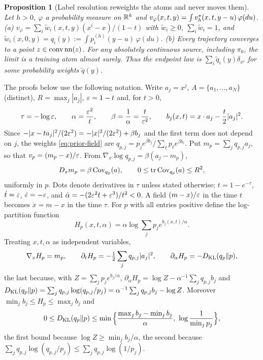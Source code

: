 \documentclass{article}
\theoremstyle{plain}
\newtheorem{proposition}{Proposition}
\theoremstyle{remark}
\begin{document}
\begin{proposition}[Label resolution reweights the atoms and never moves them]
\label{prop:filtered}
Let $h>0$, $\varphi$ a probability measure on $\mathbb{R}^k$ and
$v_\varphi(x,t,y)=\int v_h^\star(x,t,y-u)\,\varphi(du)$. (a) $v_\varphi=\sum_i\tilde
w_i(x,t,y)(x^i-x)/(1-t)$ with $\tilde w_i\ge0$, $\sum_i\tilde w_i=1$, and $\tilde
w_i(x,0,y)=q_i(y):=\int p_i^{(h)}(y-u)\,\varphi(du)$. (b) Every trajectory converges to a
point $z\in\operatorname{conv}\operatorname{nn}(z)$. For any absolutely continuous source, including
$\pi_0$, the limit is a training atom almost surely. Thus the endpoint law is
$\sum_i\tilde q_i(y)\delta_{x^i}$ for some probability weights $\tilde q(y)$.
\end{proposition}


The proofs below use the following notation. Write $a_j=x^j$, $A=\{a_1,\dots,a_N\}$ (distinct),
$R=\max_j|a_j|$, $\varepsilon=1-t$ and, for $t>0$,
\[
\tau=-\log\varepsilon,\qquad \alpha=\frac{\varepsilon^2}{t},\qquad \beta=\frac1\alpha=\frac{t}{\varepsilon^2},
\qquad b_j(x,t)=x\cdot a_j-\frac t2|a_j|^2 .
\]
Since $-|x-ta_j|^2/(2\varepsilon^2)=-|x|^2/(2\varepsilon^2)+\beta b_j$ and the first term does not depend on
$j$, the weights \eqref{eq:prior-field} are
$q_{p,j}=p_je^{\beta b_j}/\sum_\ell p_\ell e^{\beta b_\ell}$. Put $m_p=\sum_jq_{p,j}a_j$, so that
$v_p=(m_p-x)/\varepsilon$. From $\nabla_x\log q_{p,j}=\beta(a_j-m_p)$,
\begin{equation}
D_xm_p=\beta\operatorname{Cov}_{q_p}(a),\qquad 0\le\operatorname{tr}\operatorname{Cov}_{q_p}(a)\le R^2,
\label{eq:pf:int:dm}
\end{equation}
uniformly in $p$. Dots denote derivatives in $\tau$ unless stated otherwise; $t=1-e^{-\tau}$,
$\dot t=\varepsilon$, $\dot{\varepsilon}=-\varepsilon$, and $\dot\alpha=-(2\varepsilon^2t+\varepsilon^3)/t^2<0$. A field
$(m-x)/\varepsilon$ in the time $t$ becomes $\dot x=m-x$ in the time $\tau$. For $p$ with all
entries positive define the log-partition function
\[
H_p(x,t,\alpha)=\alpha\log\sum_jp_je^{b_j(x,t)/\alpha}.
\]
Treating $x,t,\alpha$ as independent variables,
\begin{equation}
\nabla_xH_p=m_p,\qquad \partial_tH_p=-\tfrac12\sum_jq_{p,j}|a_j|^2,\qquad
\partial_\alpha H_p=-D_{\rm KL}(q_p\Vert p),
\label{eq:pf:int:dH}
\end{equation}
the last because, with $Z=\sum_jp_je^{b_j/\alpha}$,
$\partial_\alpha H_p=\log Z-\alpha^{-1}\sum_jq_{p,j}b_j$ and
$D_{\rm KL}(q_p\Vert p)=\sum_jq_{p,j}\log(q_{p,j}/p_j)=\alpha^{-1}\sum_jq_{p,j}b_j-\log Z$.
Moreover $\min_jb_j\le H_p\le\max_jb_j$ and
\begin{equation}
0\le D_{\rm KL}(q_p\Vert p)\le\min\Big\{\frac{\max_jb_j-\min_jb_j}{\alpha},\ \log\frac1{\min_jp_j}\Big\},
\label{eq:pf:int:kl}
\end{equation}
the first bound because $\log Z\ge\min_jb_j/\alpha$, the second because
$\sum_jq_{p,j}\log(q_{p,j}/p_j)\le\sum_jq_{p,j}\log(1/p_j)$.
\end{document}
